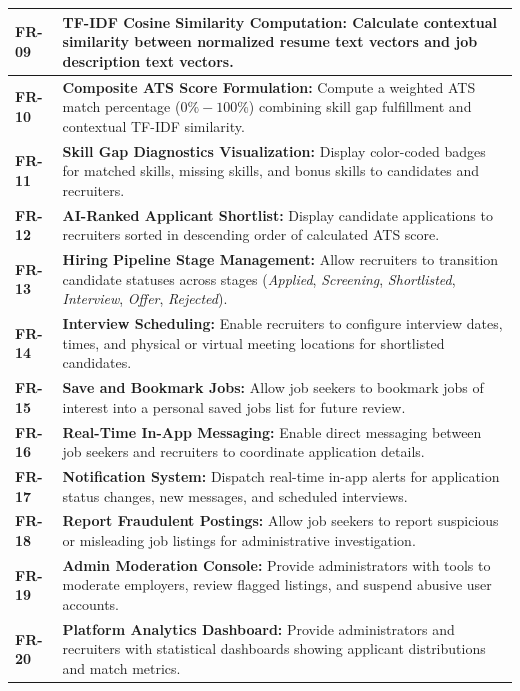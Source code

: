 \begin{table}[h!]
\begin{tabular}{|l|p{12cm}|}
\textbf{FR-09} & \textbf{TF-IDF Cosine Similarity Computation:} Calculate contextual similarity between normalized resume text vectors and job description text vectors. \\ \hline
\textbf{FR-10} & \textbf{Composite ATS Score Formulation:} Compute a weighted ATS match percentage ($0\% - 100\%$) combining skill gap fulfillment and contextual TF-IDF similarity. \\ \hline
\textbf{FR-11} & \textbf{Skill Gap Diagnostics Visualization:} Display color-coded badges for matched skills, missing skills, and bonus skills to candidates and recruiters. \\ \hline
\textbf{FR-12} & \textbf{AI-Ranked Applicant Shortlist:} Display candidate applications to recruiters sorted in descending order of calculated ATS score. \\ \hline
\textbf{FR-13} & \textbf{Hiring Pipeline Stage Management:} Allow recruiters to transition candidate statuses across stages (\textit{Applied}, \textit{Screening}, \textit{Shortlisted}, \textit{Interview}, \textit{Offer}, \textit{Rejected}). \\ \hline
\textbf{FR-14} & \textbf{Interview Scheduling:} Enable recruiters to configure interview dates, times, and physical or virtual meeting locations for shortlisted candidates. \\ \hline
\textbf{FR-15} & \textbf{Save and Bookmark Jobs:} Allow job seekers to bookmark jobs of interest into a personal saved jobs list for future review. \\ \hline
\textbf{FR-16} & \textbf{Real-Time In-App Messaging:} Enable direct messaging between job seekers and recruiters to coordinate application details. \\ \hline
\textbf{FR-17} & \textbf{Notification System:} Dispatch real-time in-app alerts for application status changes, new messages, and scheduled interviews. \\ \hline
\textbf{FR-18} & \textbf{Report Fraudulent Postings:} Allow job seekers to report suspicious or misleading job listings for administrative investigation. \\ \hline
\textbf{FR-19} & \textbf{Admin Moderation Console:} Provide administrators with tools to moderate employers, review flagged listings, and suspend abusive user accounts. \\ \hline
\textbf{FR-20} & \textbf{Platform Analytics Dashboard:} Provide administrators and recruiters with statistical dashboards showing applicant distributions and match metrics. \\ \hline

\end{tabular}
\end{table}
